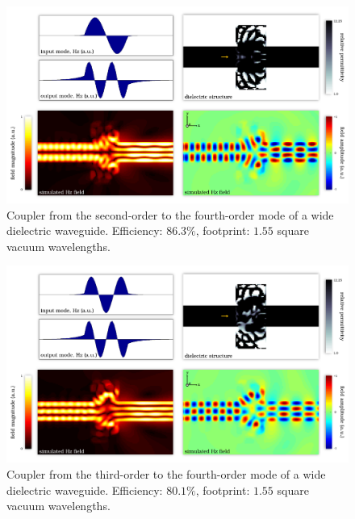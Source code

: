 \begin{figure}[h!]
    \centering
    \includegraphics[width=\textwidth]{p3/10}
    \caption{
        Coupler from the second-order to the fourth-order mode 
            of a wide dielectric waveguide.
        Efficiency: $86.3\%$,
        footprint: $1.55$ square vacuum wavelengths.
        }
\end{figure}
\begin{figure}[h!]
    \centering
    \includegraphics[width=\textwidth]{p3/11}
    \caption{
        Coupler from the third-order to the fourth-order mode 
            of a wide dielectric waveguide.
        Efficiency: $80.1\%$,
        footprint: $1.55$ square vacuum wavelengths.
        }
\end{figure}
\clearpage
